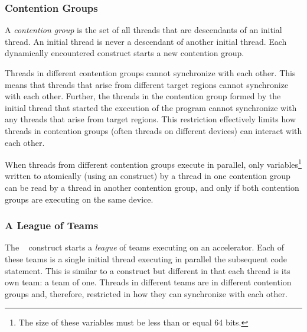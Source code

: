 \subsubsection{Contention Groups}
\label{ssec:06.contention-groups}

A \emph{contention group} is the set of all threads that are descendants of an
initial thread.  An initial thread is never a descendant of another initial
thread.  Each dynamically encountered  construct starts a new
contention group.  

Threads in different contention groups cannot synchronize with
each other.  This means that threads that arise from different target regions
cannot synchronize with each other.  Further, the threads in the contention
group formed by the initial thread that started the execution of the program
cannot synchronize with any threads that arise from target regions.  This
restriction effectively limits how threads in contention groups (often threads
on different devices) can interact with each other.

When threads from different contention groups execute in parallel, only
variables\footnote{The size of these variables must be less than or equal 64 bits.} 
written to atomically 
(using an  construct)
by a thread in one contention group can be read by a thread in another contention group, and only
if both contention groups are executing on the same device.

\subsubsection{A League of Teams}
\label{ssec:06.league-of-teams}

The ~ construct %
starts a \emph{league} of teams executing
on an accelerator. Each of these teams is a single initial thread executing
in parallel the subsequent code statement.  This is similar to a
 construct but different in that each thread is its own team: a
team of one.  Threads in different teams are in different contention groups
and, therefore, restricted in how they can synchronize with each other.  


